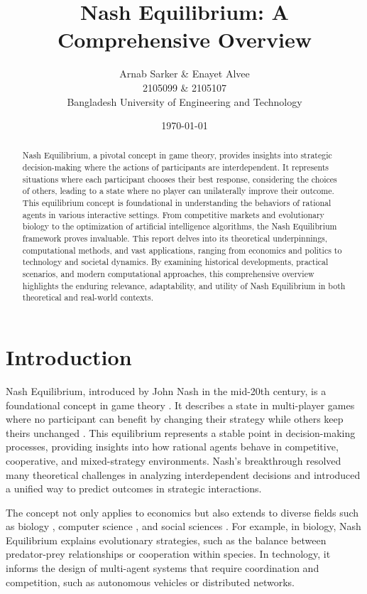 \documentclass[12pt]{article}
\title{Nash Equilibrium: A Comprehensive Overview}
\author{{\Large Arnab Sarker \& Enayet Alvee} \\
2105099   \& 2105107     \\
Bangladesh University of Engineering and Technology}
\date{\today}
\begin{document}
\maketitle
\pagebreak

\begin{abstract}
Nash Equilibrium, a pivotal concept in game theory, provides insights into strategic decision-making where the actions of participants are interdependent. It represents situations where each participant chooses their best response, considering the choices of others, leading to a state where no player can unilaterally improve their outcome. This equilibrium concept is foundational in understanding the behaviors of rational agents in various interactive settings. From competitive markets and evolutionary biology to the optimization of artificial intelligence algorithms, the Nash Equilibrium framework proves invaluable. This report delves into its theoretical underpinnings, computational methods, and vast applications, ranging from economics and politics to technology and societal dynamics. By examining historical developments, practical scenarios, and modern computational approaches, this comprehensive overview highlights the enduring relevance, adaptability, and utility of Nash Equilibrium in both theoretical and real-world contexts.
\end{abstract}

\tableofcontents
\pagebreak

\section{Introduction}
\large Nash Equilibrium, introduced by John Nash in the mid-20th century, is a foundational concept in game theory \cite{nash1950}. It describes a state in multi-player games where no participant can benefit by changing their strategy while others keep theirs unchanged \cite{osborne1994}. This equilibrium represents a stable point in decision-making processes, providing insights into how rational agents behave in competitive, cooperative, and mixed-strategy environments. Nash's breakthrough resolved many theoretical challenges in analyzing interdependent decisions and introduced a unified way to predict outcomes in strategic interactions.

The concept not only applies to economics but also extends to diverse fields such as biology \cite{smith1982}, computer science \cite{shoham2008}, and social sciences \cite{myerson1991}. For example, in biology, Nash Equilibrium explains evolutionary strategies, such as the balance between predator-prey relationships or cooperation within species. In technology, it informs the design of multi-agent systems that require coordination and competition, such as autonomous vehicles or distributed networks.
\end{document}

